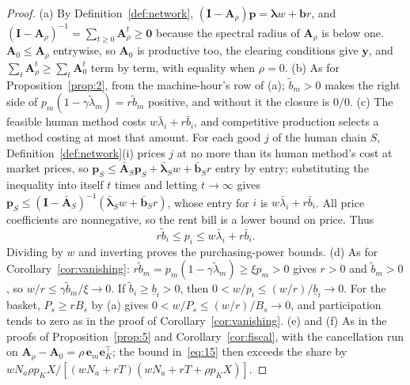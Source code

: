 \documentclass[12pt]{article}
\theoremstyle{plain}
\theoremstyle{definition}
\theoremstyle{remark}
\begin{document}
\begin{proof}
(a) By Definition~\ref{def:network}, $(\mathbf I-\mathbf A_\rho)\mathbf p=\bm\lambda w+\mathbf b r$, and $(\mathbf I-\mathbf A_\rho)^{-1}=\sum_{t\ge0}\mathbf A_\rho^t\ge\mathbf 0$ because the spectral radius of $\mathbf A_\rho$ is below one. $\mathbf A_0\le\mathbf A_\rho$ entrywise, so $\mathbf A_0$ is productive too, the clearing conditions give $\mathbf y$, and $\sum_t\mathbf A_\rho^t\ge\sum_t\mathbf A_0^t$ term by term, with equality when $\rho=0$. (b) As for Proposition~\ref{prop:2}, from the machine-hour's row of (a); $\widetilde b_m>0$ makes the right side of $p_m(1-\gamma\widetilde\lambda_m)=r\widetilde b_m$ positive, and without it the closure is $0/0$.
(c) The feasible human method costs $w\bar\lambda_i+r\bar b_i$, and competitive production selects a method costing at most that amount.
For each good $j$ of the human chain $S$, Definition~\ref{def:network}(i) prices $j$ at no more than its human method's cost at market prices, so $\mathbf p_S\le\bar{\mathbf A}_S\mathbf p_S+\bar{\bm\lambda}_Sw+\bar{\mathbf b}_Sr$ entry by entry; substituting the inequality into itself $t$ times and letting $t\to\infty$ gives $\mathbf p_S\le(\mathbf I-\bar{\mathbf A}_S)^{-1}(\bar{\bm\lambda}_Sw+\bar{\mathbf b}_Sr)$, whose entry for $i$ is $w\bar\lambda_i+r\bar b_i$.
All price coefficients are nonnegative, so the rent bill is a lower bound on price. Thus
\begin{equation}\label{eq:19}
r\widetilde{b}_i\le p_i\le w\bar\lambda_i+r\bar{b}_i.
\end{equation}
Dividing by $w$ and inverting proves the purchasing-power bounds.
(d) As for Corollary~\ref{cor:vanishing}: $r\widetilde b_m=p_m(1-\gamma\widetilde\lambda_m)\ge\xi p_m>0$ gives $r>0$ and $\widetilde b_m>0$, so $w/r\le\gamma\widetilde b_m/\xi\to0$.
If $\widetilde b_i\ge\underline b_i>0$, then $0<w/p_i\le(w/r)/\underline b_i\to0$.
For the basket, $P_s\ge rB_s$ by (a) gives $0<w/P_s\le(w/r)/B_s\to0$, and participation tends to zero as in the proof of Corollary~\ref{cor:vanishing}.
(e) and (f) As in the proofs of Proposition~\ref{prop:5} and Corollary~\ref{cor:fiscal}, with the cancellation run on $\mathbf A_\rho-\mathbf A_0=\rho\,\mathbf e_m\mathbf e_K^{\top}$; the bound in~\eqref{eq:15} then exceeds the share by $wN_a\rho p_KX/[(wN_a+rT)(wN_a+rT+\rho p_KX)]$.
\end{proof}
\end{document}
